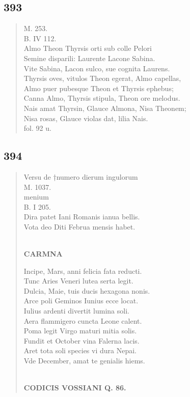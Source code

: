 \documentclass[11pt, a4paper]{report}
\begin{document}
            \subsection*{393}
      \begin{verse}
      M. 253. \\ B. IV 112. \\ Almo Theon Thyrsis orti sub colle Pelori \\ Semine disparili: Laurente Lacone Sabina. \\ Vite Sabina, Lacon sulco, sue cognita Laurens. \\ Thyrsis oves, vitulos Theon egerat, Almo capellas, \\ Almo puer pubesque Theon et Thyrsis ephebus; \\ Canna Almo, Thyrsis stipula, Theon ore melodus. \\ Nais amat Thyrsin, Glauce Almona, Nisa Theonem; \\ Nisa rosas, Glauce violas dat, lilia Nais. \\ fol. 92 u. \\ 
      \end{verse}
  
            \subsection*{394}
      \begin{verse}
      Versu de †numero dierum ingulorum  \lbrack  \\ M. 1037. \\ menium \\ B. I 205. \\ Dira patet Iani Romanis ianua bellis. \\ Vota deo Diti Februa mensis habet. \\ 
        ﻿\pagebreak 
     \marginpar{[308]} \begin{center} \textbf{CARMNA} \end{center}Incipe, Mars, anni felicia fata reducti. \\ Tunc Aries Veneri lutea serta legit. \\ Dulcia, Maie, tuis ducis hexagona nonis. \\ Arce poli Geminos Iunius ecce locat. \\ Iulius ardenti divertit lumina soli. \\ Aera flammigero cuncta Leone calent. \\ Poma legit Virgo maturi mitia solis. \\ Fundit et October vina Falerna lacis. \\ Aret tota soli species vi dura Nepai. \\ Vde December, amat te genialis hiems. \\ 
        ﻿\pagebreak 
    \begin{center} \textbf{CODICIS VOSSIANI Q. 86.} \end{center}
      \end{verse}
  
\end{document}
